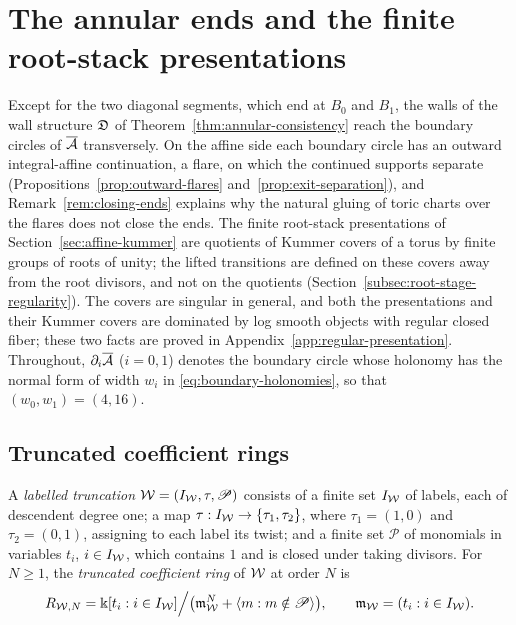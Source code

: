 \section{The annular ends and the finite root-stack presentations}
\label{sec:compactification}

Except for the two diagonal segments, which end at $B_0$ and $B_1$, the
walls of the wall structure $\mathfrak D$ of Theorem~\ref{thm:annular-consistency} reach
the boundary circles of $\overline{\mathcal A}$ transversely.  On the affine side
each boundary circle has an outward integral-affine continuation, a flare,
on which the continued supports separate
(Propositions~\ref{prop:outward-flares} and~\ref{prop:exit-separation}),
and Remark~\ref{rem:closing-ends} explains why the natural gluing of toric
charts over the flares does not close the ends.  The finite root-stack
presentations of Section~\ref{sec:affine-kummer} are quotients of Kummer
covers of a torus by finite groups of roots of unity; the lifted transitions
are defined on these covers away from the root divisors, and not on the
quotients (Section~\ref{subsec:root-stage-regularity}).  The covers are
singular in general, and both the presentations and their Kummer covers are
dominated by log smooth objects with regular closed fiber; these two facts
are proved in Appendix~\ref{app:regular-presentation}.  Throughout,
$\partial_i\overline{\mathcal A}$ ($i=0,1$) denotes
the boundary circle whose holonomy has the normal form of width $w_i$ in
\eqref{eq:boundary-holonomies}, so that $(w_0,w_1)=(4,16)$.

\subsection{Truncated coefficient rings}

\begin{definition}\label{def:coefficient-window}
A \emph{labelled truncation} $\mathcal W=(I_\mathcal W,\tau,\mathscr P)$ consists of
a finite set $I_\mathcal W$ of labels, each of descendent degree one; a map
$\tau:I_\mathcal W\to\{\tau_1,\tau_2\}$, where $\tau_1=(1,0)$ and $\tau_2=(0,1)$,
assigning to each label its twist; and a finite set $\mathscr P$ of
monomials in variables $t_i$, $i\in I_\mathcal W$, which contains $1$ and is
closed under taking divisors.  For $N\geq1$, the \emph{truncated
coefficient ring} of $\mathcal W$ at order $N$ is
\begin{equation}\label{eq:window-ring}
 R_{\mathcal W,N}=\Bbbk[t_i:i\in I_\mathcal W]\Big/
 \bigl(\mathfrak m_{\mathcal W}^N+\langle m:m\notin\mathscr P\rangle\bigr),
 \qquad \mathfrak m_{\mathcal W}=(t_i:i\in I_\mathcal W).
\end{equation}
\end{definition}

